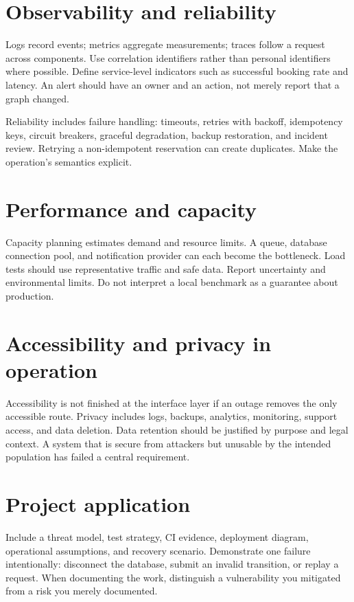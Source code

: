 \section{Observability and reliability}
Logs record events; metrics aggregate measurements; traces follow a request across components. Use correlation identifiers rather than personal identifiers where possible. Define service-level indicators such as successful booking rate and latency. An alert should have an owner and an action, not merely report that a graph changed.

Reliability includes failure handling: timeouts, retries with backoff, idempotency keys, circuit breakers, graceful degradation, backup restoration, and incident review. Retrying a non-idempotent reservation can create duplicates. Make the operation's semantics explicit.

\section{Performance and capacity}
Capacity planning estimates demand and resource limits. A queue, database connection pool, and notification provider can each become the bottleneck. Load tests should use representative traffic and safe data. Report uncertainty and environmental limits. Do not interpret a local benchmark as a guarantee about production.

\section{Accessibility and privacy in operation}
Accessibility is not finished at the interface layer if an outage removes the only accessible route. Privacy includes logs, backups, analytics, monitoring, support access, and data deletion. Data retention should be justified by purpose and legal context. A system that is secure from attackers but unusable by the intended population has failed a central requirement.

\section{Project application}
Include a threat model, test strategy, CI evidence, deployment diagram, operational assumptions, and recovery scenario. Demonstrate one failure intentionally: disconnect the database, submit an invalid transition, or replay a request. When documenting the work, distinguish a vulnerability you mitigated from a risk you merely documented.

